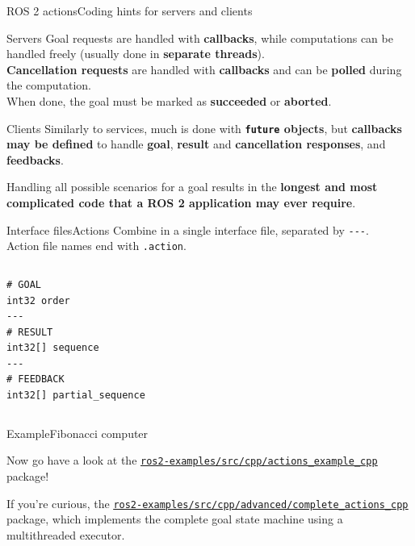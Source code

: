 \begin{frame}{ROS 2 actions}{Coding hints for servers and clients}
  \begin{block}{Servers}
    Goal requests are handled with \textbf{callbacks}, while computations can be handled freely (usually done in \textbf{separate threads}).\\
    \textbf{Cancellation requests} are handled with \textbf{callbacks} and can be \textbf{polled} during the computation.\\
    When done, the goal must be marked as \textbf{succeeded} or \textbf{aborted}.
  \end{block}
  \begin{block}{Clients}
    Similarly to services, much is done with \textbf{\texttt{future} objects}, but \textbf{callbacks may be defined} to handle \textbf{goal}, \textbf{result} and \textbf{cancellation responses}, and \textbf{feedbacks}.
  \end{block}
  \begin{block}{}
    \centering
    Handling all possible scenarios for a goal results in the \textbf{longest and most complicated code that a ROS 2 application may ever require}. {\Large\smiley{}}
  \end{block}
\end{frame}

\begin{frame}[fragile]{Interface files}{Actions}
  Combine  in a single interface file, separated by \texttt{-{}-{}-}.\\
  Action file names end with \texttt{.action}.
  \begin{columns}
  \begin{lstlisting}[language=ros2msg, caption=Definition of the \texttt{ros2\_examples\_interfaces/action/Fibonacci} action.]
# GOAL
int32 order
---
# RESULT
int32[] sequence
---
# FEEDBACK
int32[] partial_sequence\end{lstlisting}
  \end{columns}
\end{frame}

\begin{frame}{Example}{Fibonacci computer}
  \begin{block}{}
    \centering
    Now go have a look at the \href{https://github.com/IntelligentSystemsLabUTV/ros2-examples/tree/humble/src/cpp/actions_example_cpp}{\color{blue}\underline{\texttt{ros2-examples/src/cpp/actions\_example\_cpp}}} package!
  \end{block}
  If you're curious, the \href{https://github.com/IntelligentSystemsLabUTV/ros2-examples/tree/humble/src/cpp/advanced/complete_actions_cpp}{\color{blue}\underline{\texttt{ros2-examples/src/cpp/advanced/complete\_actions\_cpp}}} package, which implements the complete goal state machine using a multithreaded executor.
\end{frame}
